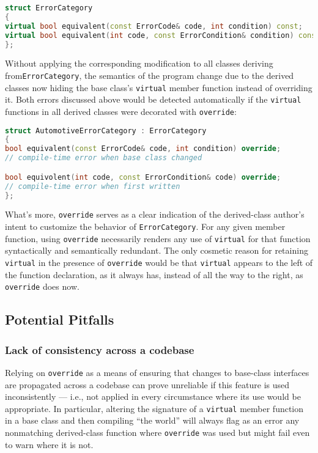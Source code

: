 \begin{lstlisting}[language=C++]
struct ErrorCategory
{
virtual bool equivalent(const ErrorCode& code, int condition) const;
virtual bool equivalent(int code, const ErrorCondition& condition) const;
};
\end{lstlisting}

Without applying the corresponding modification to all classes deriving
from\linebreak[4] \lstinline!ErrorCategory!, the semantics of the program change due to
the derived classes now hiding
the base class's
\lstinline!virtual! member function instead of overriding it. Both errors discussed above
would be detected automatically if the \lstinline!virtual!
functions in all derived classes were decorated with \lstinline!override!:

\begin{lstlisting}[language=C++]
struct AutomotiveErrorCategory : ErrorCategory
{
bool equivalent(const ErrorCode& code, int condition) override;
// compile-time error when base class changed

bool equivolent(int code, const ErrorCondition& code) override;
// compile-time error when first written
};
\end{lstlisting}

\noindent What's more, \lstinline!override! serves as a clear indication of the derived-class author's intent to customize the
behavior of \lstinline!ErrorCategory!. For any given member function, using \lstinline!override! necessarily renders any use of \lstinline!virtual! for
that function syntactically and semantically redundant. The only
cosmetic reason for retaining \lstinline!virtual! in the presence of
\lstinline!override! would be that \lstinline!virtual! appears to the left of
the function declaration, as it always has, instead of all the way to
the right, as \lstinline!override! does now.

\subsection[Potential Pitfalls]{Potential Pitfalls}\label{potential-pitfalls}

\subsubsection[Lack of consistency across a codebase]{Lack of consistency across a codebase}\label{lack-of-consistency-across-a-codebase}

Relying on \lstinline!override! as a means of ensuring that changes to
base-class interfaces are propagated across a codebase can prove
unreliable if this feature is used inconsistently --- i.e., not applied in every circumstance where its use would be appropriate. In
particular, altering the signature of a \lstinline!virtual! member function
in a base class and then compiling ``the world'' will always flag as an
error any nonmatching derived-class function where \lstinline!override!
was used but might fail even to warn where it is not.

